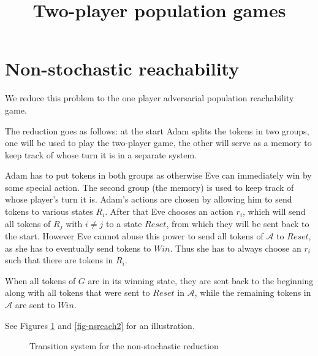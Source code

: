 \documentclass{article}
\title{Two-player population games}
\author{}
\date{}
\begin{document}
\maketitle

\section{Non-stochastic reachability}

We reduce this problem to the one player adversarial population reachability game.

The reduction goes as follows: at the start Adam splits the tokens in two groups, one will be used to play the two-player game, the other will serve as a memory to keep track of whose turn it is in a separate system.

Adam has to put tokens in both groups as otherwise Eve can immediately win by some special action. The second group (the memory) is used to keep track of whose player's turn it is. Adam's actions are chosen by allowing him to send tokens to various states $R_i$. After that Eve chooses an action $r_i$, which will send all tokens of $R_j$ with $i\neq j$ to a state $Reset$, from which they will be sent back to the start. However Eve cannot abuse this power to send all tokens of $\mathcal{A}$ to $Reset$, as she has to eventually send tokens to $Win$. Thus she has to always choose an $r_i$ such that there are tokens in $R_i$.

When all tokens of $G$ are in its winning state, they are sent back to the beginning along with all tokens that were sent to $Reset$ in $\mathcal{A}$, while the remaining tokens in $\mathcal{A}$ are sent to $Win$. 

See Figures \ref{fig-nsreach1} and \ref{fig-nsreach2} for an illustration.

\begin{figure}[h]
	\caption{Transition system for the non-stochastic reduction}
	\label{fig-nsreach1}
\end{figure}
\end{document}
